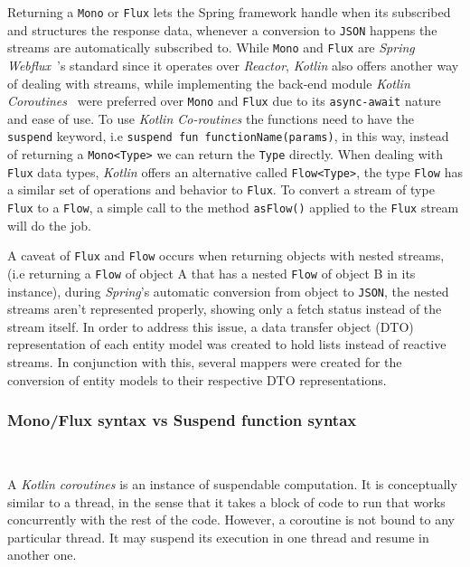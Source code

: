 Returning a \texttt{Mono} or \texttt{Flux} lets the Spring framework handle when its subscribed and structures the response data, whenever a conversion to \texttt{JSON} happens the streams are automatically subscribed to.
While \texttt{Mono} and \texttt{Flux} are \textit{Spring Webflux}~\cite{spring-webflux}'s standard since it operates over \textit{Reactor}, \textit{Kotlin} also offers another way of dealing with streams, while implementing the back-end module \textit{Kotlin Coroutines}~\cite{kotlin-coroutines} were preferred over \texttt{Mono} and \texttt{Flux} due to its \texttt{async-await} nature and ease of use. To use \textit{Kotlin Co-routines} the functions need to have the \texttt{suspend} keyword, i.e \texttt{suspend fun functionName(params)}, in this way, instead of returning a \texttt{Mono<Type>} we can return the \texttt{Type} directly. When dealing with \texttt{Flux} data types, \textit{Kotlin} offers an alternative called \texttt{Flow<Type>}, the type \texttt{Flow} has a similar set of operations and behavior to \texttt{Flux}. To convert a stream of type \texttt{Flux} to a \texttt{Flow}, a simple call to the method \texttt{asFlow()} applied to the \texttt{Flux} stream will do the job.

A caveat of \texttt{Flux} and \texttt{Flow} occurs when returning objects with nested streams, (i.e returning a \texttt{Flow} of object A that has a nested \texttt{Flow} of object B in its instance), during \textit{Spring}'s automatic conversion from object to \texttt{JSON}, the nested streams aren't represented properly, showing only a fetch status instead of the stream itself. In order to address this issue, a data transfer object (DTO) representation of each entity model was created to hold lists instead of reactive streams. In conjunction with this, several mappers were created for the conversion of entity models to their respective DTO representations.


\subsubsection{Mono/Flux syntax vs Suspend function syntax}~\label{subsubsec:kotlin-coroutines}

A \textit{Kotlin coroutines} is an instance of suspendable computation. It is conceptually similar to a thread, in the sense that it takes a block of code to run that works concurrently with the rest of the code. However, a coroutine is not bound to any particular thread. It may suspend its execution in one thread and resume in another one.~\cite{kotlin-coroutines-your-first}

